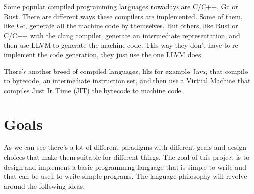 ﻿\documentclass[10pt,a4paper,twocolumn,twoside]{article}
\begin{document}
Some popular compiled programming languages nowadays are C/C++, Go or Rust.
There are different ways these compilers are implemented. Some of them, like Go,
generate all the machine code by themselves. But others, like Rust or C/C++ with
the clang compiler, generate an intermediate representation, and then use LLVM
to generate the machine code. This way they don't have to re-implement the code
generation, they just use the one LLVM does.

There's another breed of compiled languages, like for example Java, that
compile to bytecode, an intermediate instruction set, and then use a Virtual 
Machine that compiles Just In Time (JIT) the bytecode to machine code.



\section{Goals}

As we can see there's a lot of different paradigms with different goals and
design choices that make them suitable for different things. The goal of this
project is to design and implement a basic programming language that is simple
to write and that can be used to write simple programs. The language philosophy
will revolve around the following ideas:
\end{document}
